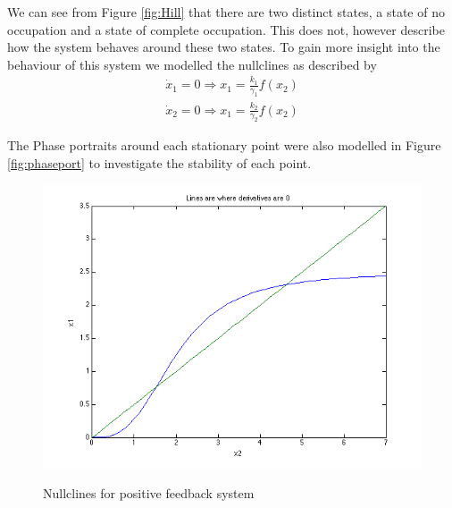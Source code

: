 \documentclass[]{article}
\begin{document}
We can see from Figure \ref{fig:Hill} that there are two distinct states,  a state of no occupation and a state of complete occupation. This does not, however describe how the system behaves around these two states. To gain more insight into the behaviour of this system we modelled the nullclines as described by 
	\begin{align}
		\dot{x}_1=0 \Rightarrow x_1=\frac{k_1}{\gamma_1}f(x_2)\\
		\dot{x}_2=0 \Rightarrow x_1=\frac{k_2}{\gamma_2}f(x_2)
	\end{align}

The Phase portraits around each stationary point were also modelled in Figure \ref{fig:phaseport}  to investigate the stability of each point.

\begin{figure}[h]
\caption{Nullclines for positive feedback system}
\centering
\includegraphics[scale = 0.5]{zeros.png}
\label{fig:nullclines}
\end{figure}

\pagebreak 
\end{document}
